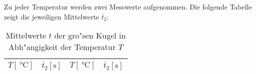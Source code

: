 		Zu jeder Temperatur werden zwei Messwerte aufgenommen. Die folgende Tabelle zeigt die jeweiligen Mittelwerte $\overline{t}_2$:

		\begin{table}[h!]
			\centering
			\caption{Mittelwerte $t$ der gro"sen Kugel in Abh"angigkeit der Temperatur $T$}
			\begin{tabular}{|c|c||c|c|}
				\hline
				$T [\SI{}{\celsius}]$ & $\overline{t}_2 [\mathrm{s}]$ & $T [\SI{}{\celsius}]$ & $\overline{t}_2 [\mathrm{s}]$ \\
				\hline
				\hline
				
				\hline
			\end{tabular}
		\end{table}


